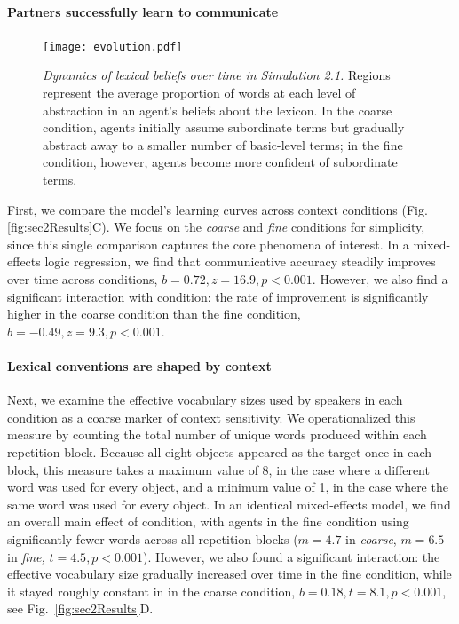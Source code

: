 \paragraph{Partners successfully learn to communicate}

\begin{figure}[t]
\begin{center}
\texttt{[image: evolution.pdf]}
\caption{\emph{Dynamics of lexical beliefs over time in Simulation 2.1.} Regions represent the average proportion of words at each level of abstraction in an agent's beliefs about the lexicon. In the coarse condition, agents initially assume subordinate terms but gradually abstract away to a smaller number of basic-level terms; in the fine condition, however, agents become more confident of subordinate terms.}
\label{fig:evolution}
\end{center}
\end{figure}

First, we compare the model's learning curves across context conditions (Fig. \ref{fig:sec2Results}C). 
We focus on the \emph{coarse} and \emph{fine} conditions for simplicity, since this single comparison captures the core phenomena of interest.
In a mixed-effects logic regression, we find that communicative accuracy steadily improves over time across conditions, $b=0.72, z = 16.9, p<0.001$.
However, we also find a significant interaction with condition: the rate of improvement is significantly higher in the coarse condition than the fine condition, $b=-0.49, z=9.3, p <0.001$. 

\paragraph{Lexical conventions are shaped by context}

Next, we examine the effective vocabulary sizes used by speakers in each condition as a coarse marker of context sensitivity. 
We operationalized this measure by counting the total number of unique words produced within each repetition block.
Because all eight objects appeared as the target once in each block, this measure takes a maximum value of 8, in the case where a different word was used for every object, and a minimum value of 1, in the case where the same word was used for every object.
In an identical mixed-effects model, we find an overall main effect of condition, with agents in the fine condition using significantly fewer words across all repetition blocks ($m = 4.7$ in \emph{coarse}, $m=6.5$ in \emph{fine,} $t = 4.5, p < 0.001$).
However, we also found a significant interaction: the effective vocabulary size gradually increased over time in the fine condition, while it stayed roughly constant in in the coarse condition, $b = 0.18, t = 8.1, p < 0.001$, see Fig.~\ref{fig:sec2Results}D.

